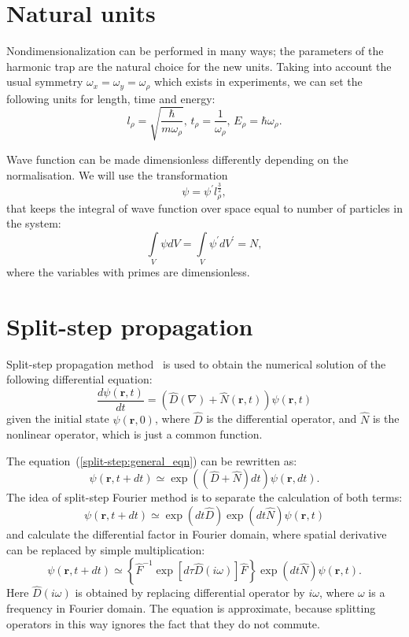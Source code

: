 \documentclass[12pt,notitlepage]{report}
\begin{document}
\appendix

\chapter{Natural units}
\label{chapter:natural_units}

Nondimensionalization can be performed in many ways;
the parameters of the harmonic trap are the natural choice for the new units.
Taking into account the usual symmetry $\omega_x = \omega_y = \omega_\rho$ which exists in experiments,
we can set the following units for length, time and energy:
\[
l_\rho =  \sqrt{\frac{\hbar}{m\omega_\rho}},\, t_\rho = \frac{1}{\omega_\rho},\, E_\rho = \hbar \omega_\rho.
\]

Wave function can be made dimensionless differently depending on the normalisation.
We will use the transformation
\[
\psi = \psi^\prime l_\rho^\frac{3}{2},
\]
that keeps the integral of wave function over space equal to number of particles in the system:
\[
\int\limits_V \psi dV = \int\limits_V \psi^\prime dV^\prime = N,
\]
where the variables with primes are dimensionless.

\chapter{Split-step propagation}
\label{chapter:split-step}

Split-step propagation method~\cite{hardin_tappert_1973} is used to obtain the numerical solution of the following differential equation:
\begin{equation}
\label{split-step:general_eqn}
\frac{d\psi(\mathbf{r}, t)}{dt} = ( \hat{D}(\nabla) + \hat{N}(\mathbf{r}, t) ) \psi(\mathbf{r}, t)
\end{equation}
given the initial state $\psi(\mathbf{r}, 0)$, 
where $\hat{D}$ is the differential operator, and $\hat{N}$ is the nonlinear operator,
which is just a common function.

The equation~(\ref{split-step:general_eqn}) can be rewritten as:
\[
\psi(\mathbf{r}, t + dt) \simeq \exp ( ( \hat{D} + \hat{N} ) dt ) \psi(\mathbf{r}, dt).
\]
The idea of split-step Fourier method is to separate the calculation of both terms:
\begin{equation}
\label{split-step:split_eqn}
\psi(\mathbf{r}, t + dt) \simeq \exp(dt \hat{D}) \exp(dt \hat{N}) \psi(\mathbf{r}, t)
\end{equation}
and calculate the differential factor in Fourier domain, where spatial derivative can be replaced by simple multiplication:
\[
\psi(\mathbf{r}, t + dt) \simeq \left\{ \hat{F}^{-1} \exp \left[ d\tau \hat{D}(i\omega) \right] \hat{F} \right\}
\exp(dt \hat{N}) \psi(\mathbf{r}, t).
\]
Here $\hat{D}(i\omega)$ is obtained by replacing differential operator by $i \omega$,
where $\omega$ is a frequency in Fourier domain.
The equation is approximate, because splitting operators in this way ignores the fact that they do not commute.
\end{document}
